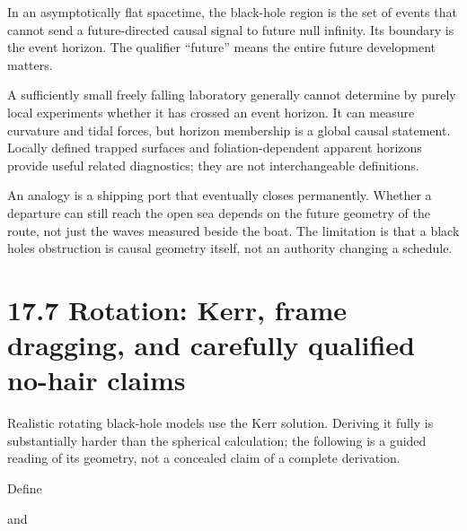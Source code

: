 \documentclass[
  11pt,
  letterpaper,
  oneside,
  openany]{scrbook}
\begin{document}
In an asymptotically flat spacetime, the black-hole region is the set of
events that cannot send a future-directed causal signal to future null
infinity. Its boundary is the event horizon. The qualifier ``future''
means the entire future development matters.

A sufficiently small freely falling laboratory generally cannot
determine by purely local experiments whether it has crossed an event
horizon. It can measure curvature and tidal forces, but horizon
membership is a global causal statement. Locally defined trapped
surfaces and foliation-dependent apparent horizons provide useful
related diagnostics; they are not interchangeable definitions.

An analogy is a shipping port that eventually closes permanently.
Whether a departure can still reach the open sea depends on the future
geometry of the route, not just the waves measured beside the boat. The
limitation is that a black hole\textquotesingle s obstruction is causal
geometry itself, not an authority changing a schedule.

\hypertarget{rotation-kerr-frame-dragging-and-carefully-qualified-no-hair-claims}{%
\section{17.7 Rotation: Kerr, frame dragging, and carefully qualified
no-hair
claims}\label{rotation-kerr-frame-dragging-and-carefully-qualified-no-hair-claims}}

Realistic rotating black-hole models use the Kerr solution. Deriving it
fully is substantially harder than the spherical calculation; the
following is a guided reading of its geometry, not a concealed claim of
a complete derivation.

Define

\begin{center}
\begingroup
{}
\ifdim\wd\grmathbox>\linewidth
\resizebox{\linewidth}{!}{\usebox{\grmathbox}}
\else\usebox{\grmathbox}\fi
\endgroup
\end{center}

and

\begin{center}
\begingroup
{}
\ifdim\wd\grmathbox>\linewidth
\resizebox{\linewidth}{!}{\usebox{\grmathbox}}
\else\usebox{\grmathbox}\fi
\endgroup
\end{center}
\end{document}
